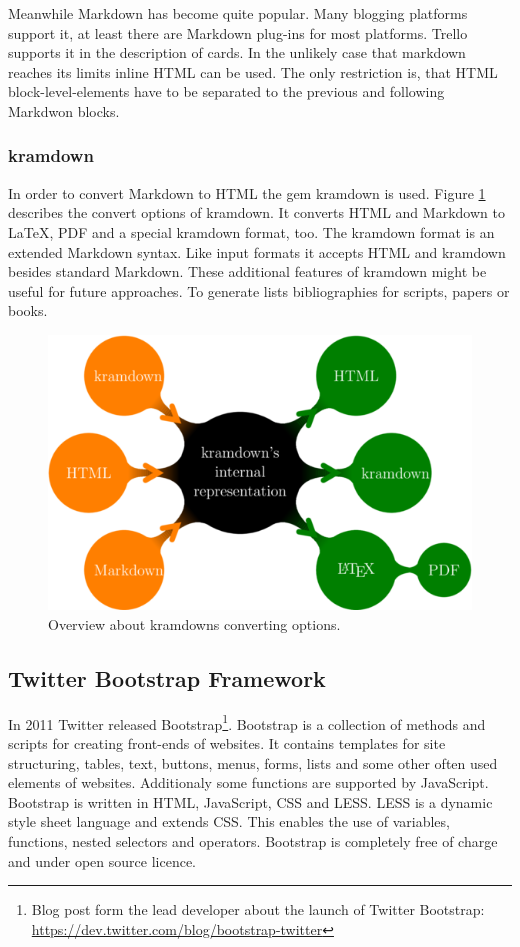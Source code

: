 Meanwhile Markdown has become quite popular. Many blogging platforms support it, at least there are Markdown plug-ins for most platforms. Trello supports it in the description of cards. In the unlikely case that markdown reaches its limits inline HTML can be used. The only restriction is, that HTML block-level-elements have to be separated to the previous and following Markdwon blocks.

\subsubsection{kramdown}

In order to convert Markdown to HTML the gem kramdown is used. Figure \ref{fig:kramdown} describes the convert options of kramdown. It converts HTML and Markdown to LaTeX, PDF and a special kramdown format, too. The kramdown format is an extended Markdown syntax. Like input formats it accepts HTML and kramdown besides standard Markdown. \cite{kramdown} These additional features of kramdown might be useful for future approaches. To generate lists bibliographies for scripts, papers or books.

\begin{figure}[htb]
\centering
\includegraphics[width=\textwidth]{figures/kramdown}
\caption{Overview about kramdowns converting options. \cite{kramdown}}
\label{fig:kramdown}
\end{figure}

\subsection{Twitter Bootstrap Framework}
In 2011 Twitter released Bootstrap\footnote{Blog post form the lead developer about the launch of Twitter Bootstrap: \url{https://dev.twitter.com/blog/bootstrap-twitter}}. Bootstrap is a collection of methods and scripts for creating front-ends of websites. It contains templates for site structuring, tables, text, buttons, menus, forms, lists and some other often used elements of websites. Additionaly some functions are supported by JavaScript. Bootstrap is written in HTML, JavaScript, CSS and LESS. LESS is a dynamic style sheet language and extends CSS. This enables the use of variables, functions, nested selectors and operators.\cite{less} Bootstrap is completely free of charge and under open source licence. \cite{bootstrap}

